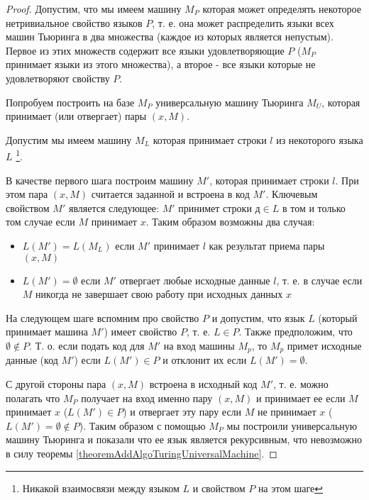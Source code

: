 \begin{proof}
Допустим, что мы имеем машину $M_P$ которая может определять
некоторое нетривиальное свойство языков $P$, т. е. она может
распределить языки всех 
машин Тьюринга в два множества (каждое из которых является непустым). 
Первое из этих множеств содержит все языки удовлетворяющие $P$ ($M_P$
принимает языки из этого множества), а второе - все языки которые не
удовлетворяют свойству $P$. 

Попробуем построить на базе $M_P$ универсальную машину Тьюринга $M_U$,
которая принимает (или отвергает) пары $\left(x, M\right)$.

Допустим мы имеем машину $M_L$ которая принимает строки $l$ из
некоторого языка $L$
\footnote{Никакой взаимосвязи между языком $L$ и свойством $P$ на этом шаге}.

В качестве первого шага построим машину $M'$, которая принимает строки
$l$. При этом пара $\left(x, M\right)$ считается заданной и встроена в
код $M'$. Ключевым свойством $M'$ является следующее: $M'$ принимет
строки $д \in L$ в том и только том случае если $M$ 
принимает $x$. Таким образом возможны два случая:
\begin{itemize}
\item $L(M') = L(M_L)$ если $M'$ принимает $l$ как результат приема
  пары $\left(x, M\right)$ 
\item $L(M') = \emptyset$ если $M'$ отвергает любые исходные данные
  $l$,
т. е. в случае если $M$ никогда не завершает свою работу при исходных
данных $x$ 
\end{itemize}

На следующем шаге вспомним про свойство $P$ и допустим, что язык $L$
(который принимает машина $M'$) имеет свойство $P$, т. е. $L \in
P$. Также предположим, что $\emptyset \notin P$. Т. о. если подать код
для $M'$ на вход машины $M_p$, то $M_p$ примет исходные данные (код
$M'$) если $L(M') \in P$ и отклонит их если $L(M') = \emptyset$.

С другой стороны пара $\left(x, M\right)$ встроена в исходный код
$M'$, т. е. можно полагать что $M_P$ получает на вход именно пару 
$\left(x, M\right)$ и принимает ее если $M$ принимает $x$
($L\left(M'\right) \in P$) и отвергает
эту пару если $M$ не принимает $x$ 
($L\left(M'\right) = \emptyset \notin P$). Таким образом с помощью
$M_P$ мы построили универсальную машину Тьюринга и показали что ее
язык является рекурсивным, что невозможно в силу теоремы 
\ref{theoremAddAlgoTuringUniversalMachine}.
\end{proof}


